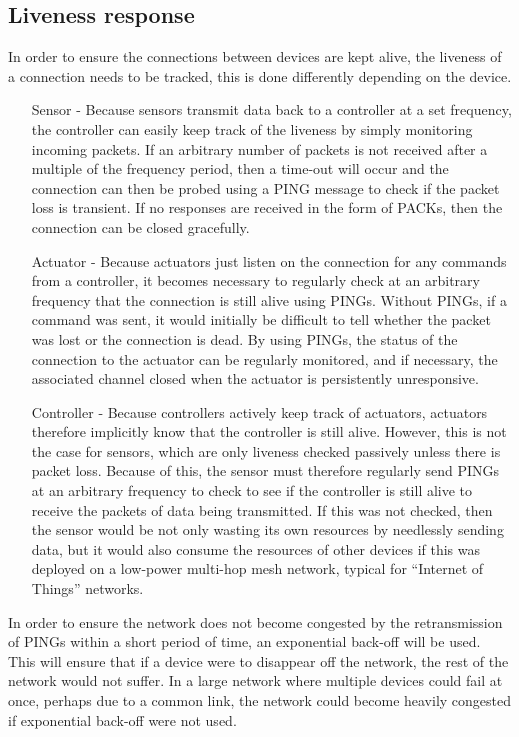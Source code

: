 \subsection{Liveness response} %
\label{sub:liveness_response}
In order to ensure the connections between devices are kept alive, the liveness of a connection needs to be tracked, this is done differently depending on the device.
\begin{itemize}
	\item [Sensor -] Because sensors transmit data back to a controller at a set frequency, the controller can easily keep track of the liveness by simply monitoring incoming packets. If an arbitrary number of packets is not received after a multiple of the frequency period, then a time-out will occur and the connection can then be probed using a PING message to check if the packet loss is transient. If no responses are received in the form of PACKs, then the connection can be closed gracefully. 
	\item [Actuator -] Because actuators just listen on the connection for any commands from a controller, it becomes necessary to regularly check at an arbitrary frequency that the connection is still alive using PINGs. Without PINGs, if a command was sent, it would initially be difficult to tell whether the packet was lost or the connection is dead. By using PINGs, the status of the connection to the actuator can be regularly monitored, and if necessary, the associated channel closed when the actuator is persistently unresponsive.
	\item [Controller -] Because controllers actively keep track of actuators, actuators therefore implicitly know that the controller is still alive. However, this is not the case for sensors, which are only liveness checked passively unless there is packet loss. Because of this, the sensor must therefore regularly send PINGs at an arbitrary frequency to check to see if the controller is still alive to receive the packets of data being transmitted. If this was not checked, then the sensor would be not only wasting its own resources by needlessly sending data, but it would also consume the resources of other devices if this was deployed on a low-power multi-hop mesh network, typical for ``Internet of Things'' networks.
\end{itemize}

In order to ensure the network does not become congested by the retransmission of PINGs within a short period of time, an exponential back-off will be used. This will ensure that if a device were to disappear off the network, the rest of the network would not suffer. In a large network where multiple devices could fail at once, perhaps due to a common link, the network could become heavily congested if exponential back-off were not used.

